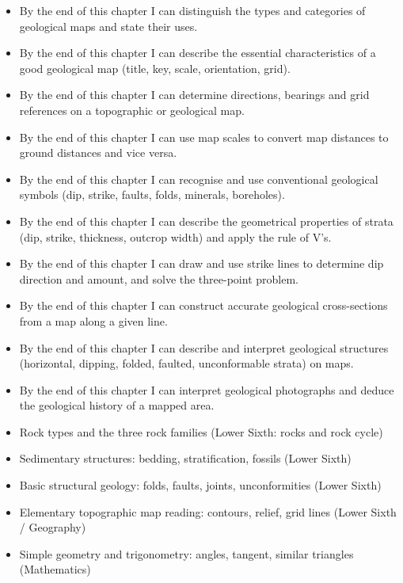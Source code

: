 \documentclass[11pt]{article}
\begin{document}
\begin{objectifs}
\begin{itemize}
\item By the end of this chapter I can distinguish the types and categories of geological maps and state their uses.
\item By the end of this chapter I can describe the essential characteristics of a good geological map (title, key, scale, orientation, grid).
\item By the end of this chapter I can determine directions, bearings and grid references on a topographic or geological map.
\item By the end of this chapter I can use map scales to convert map distances to ground distances and vice versa.
\item By the end of this chapter I can recognise and use conventional geological symbols (dip, strike, faults, folds, minerals, boreholes).
\item By the end of this chapter I can describe the geometrical properties of strata (dip, strike, thickness, outcrop width) and apply the rule of V's.
\item By the end of this chapter I can draw and use strike lines to determine dip direction and amount, and solve the three-point problem.
\item By the end of this chapter I can construct accurate geological cross-sections from a map along a given line.
\item By the end of this chapter I can describe and interpret geological structures (horizontal, dipping, folded, faulted, unconformable strata) on maps.
\item By the end of this chapter I can interpret geological photographs and deduce the geological history of a mapped area.
\end{itemize}
\end{objectifs}

\begin{prerequis}
\begin{itemize}
\item Rock types and the three rock families (Lower Sixth: rocks and rock cycle)
\item Sedimentary structures: bedding, stratification, fossils (Lower Sixth)
\item Basic structural geology: folds, faults, joints, unconformities (Lower Sixth)
\item Elementary topographic map reading: contours, relief, grid lines (Lower Sixth / Geography)
\item Simple geometry and trigonometry: angles, tangent, similar triangles (Mathematics)
\end{itemize}
\end{prerequis}
\end{document}
